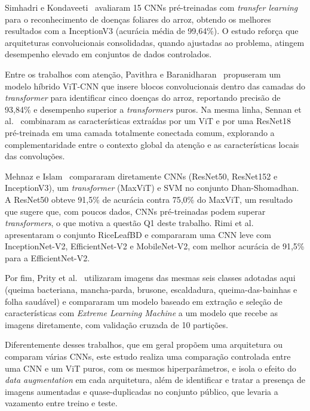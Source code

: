 \documentclass[conference]{IEEEtran}
\begin{document}
Simhadri e Kondaveeti~\cite{simhadri2023automatic} avaliaram 15 CNNs pré-treinadas com \textit{transfer learning} para o reconhecimento de doenças foliares do arroz, obtendo os melhores resultados com a InceptionV3 (acurácia média de 99,64\%). O estudo reforça que arquiteturas convolucionais consolidadas, quando ajustadas ao problema, atingem desempenho elevado em conjuntos de dados controlados.

Entre os trabalhos com atenção, Pavithra e Baranidharan~\cite{pavithra2024hybrid} propuseram um modelo híbrido ViT-CNN que insere blocos convolucionais dentro das camadas do \textit{transformer} para identificar cinco doenças do arroz, reportando precisão de 93,84\% e desempenho superior a \textit{transformers} puros. Na mesma linha, Sennan et al.~\cite{sennan2025hybrid} combinaram as características extraídas por um ViT e por uma ResNet18 pré-treinada em uma camada totalmente conectada comum, explorando a complementaridade entre o contexto global da atenção e as características locais das convoluções.

Mehnaz e Islam~\cite{mehnaz2025comparative} compararam diretamente CNNs (ResNet50, ResNet152 e InceptionV3), um \textit{transformer} (MaxViT) e SVM no conjunto Dhan-Shomadhan. A ResNet50 obteve 91,5\% de acurácia contra 75,0\% do MaxViT, um resultado que sugere que, com poucos dados, CNNs pré-treinadas podem superar \textit{transformers}, o que motiva a questão Q1 deste trabalho. Rimi et al.~\cite{rimi2025riceleafbd} apresentaram o conjunto RiceLeafBD e compararam uma CNN leve com InceptionNet-V2, EfficientNet-V2 e MobileNet-V2, com melhor acurácia de 91,5\% para a EfficientNet-V2.

Por fim, Prity et al.~\cite{prity2025neural} utilizaram imagens das mesmas seis classes adotadas aqui (queima bacteriana, mancha-parda, brusone, escaldadura, queima-das-bainhas e folha saudável) e compararam um modelo baseado em extração e seleção de características com \textit{Extreme Learning Machine} a um modelo que recebe as imagens diretamente, com validação cruzada de 10 partições.

Diferentemente desses trabalhos, que em geral propõem uma arquitetura ou comparam várias CNNs, este estudo realiza uma comparação controlada entre uma CNN e um ViT puros, com os mesmos hiperparâmetros, e isola o efeito do \textit{data augmentation} em cada arquitetura, além de identificar e tratar a presença de imagens aumentadas e quase-duplicadas no conjunto público, que levaria a vazamento entre treino e teste.
\end{document}

